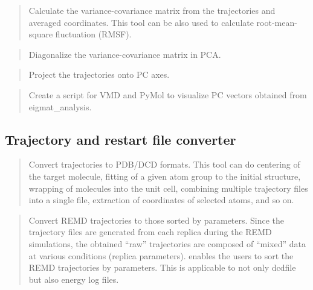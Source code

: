 \documentclass[a4paper,11pt,oneside,english]{sphinxmanual}
\begin{document}
\begin{quote}

Calculate the variance-covariance matrix from the trajectories and averaged coordinates.
This tool can be also used to calculate root-mean-square fluctuation (RMSF).
\end{quote}

\begin{quote}

Diagonalize the variance-covariance matrix in PCA.
\end{quote}

\begin{quote}

Project the trajectories onto PC axes.
\end{quote}

\begin{quote}

Create a script for VMD and PyMol to visualize PC vectors obtained from eigmat\_analysis.
\end{quote}


\subsection{Trajectory and restart file converter}
\label{\detokenize{02_Available_Programs:trajectory-and-restart-file-converter}}
\begin{quote}

Convert trajectories to PDB/DCD formats.
This tool can do centering of the target molecule,
fitting of a given atom group to the initial structure,
wrapping of molecules into the unit cell,
combining multiple trajectory files into a single file,
extraction of coordinates of selected atoms, and so on.
\end{quote}

\begin{quote}

Convert REMD trajectories to those sorted by parameters.
Since the trajectory files are generated from each replica during the REMD simulations,
the obtained “raw” trajectories are composed of “mixed” data at various conditions (replica parameters).
 enables the users to sort the REMD trajectories by parameters.
This is applicable to not only dcdfile but also energy log files.
\end{quote}
\end{document}
